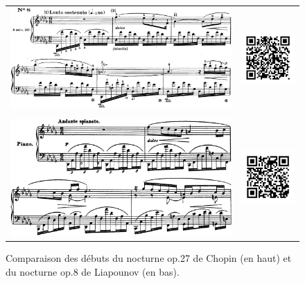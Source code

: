 \begin{figure}[!p]
  \begin{bigcenter}
    \vspace*{1.0cm}
    \begin{tabular}{lr}
      \vspace*{0.0cm}
      \includegraphics[width=12.5cm, keepaspectratio]{nocturne-chopin.png}
      &
      \includegraphics[width=3cm, keepaspectratio]{nocturne-chopin-qr.png}
      \\
      \vspace{0.5cm} &
      \\
      \includegraphics[width=12.5cm, keepaspectratio]{op8.png}
      &
      \includegraphics[width=3cm, keepaspectratio]{op8-qr.png}
    \end{tabular}
  \end{bigcenter}
  \caption{\label{op11-xi}Comparaison des débuts du nocturne op.27  de Chopin (en haut) et du nocturne op.8 de Liapounov (en bas).}
\end{figure}

